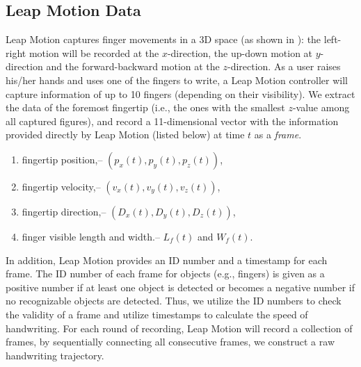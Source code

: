\subsection{Leap Motion Data}
Leap Motion captures finger movements in a 3D space (as shown in ):  the left-right motion will be recorded at the $x$-direction, the up-down motion at $y$-direction and the forward-backward motion at the $z$-direction. 
As a user raises his/her hands and uses one of the fingers to write,  a Leap Motion controller will capture information of up to 10 fingers (depending on their visibility). We extract the data of the foremost fingertip (i.e., the ones with the smallest $z$-value among all captured figures), and record a 11-dimensional vector with the information provided directly by Leap Motion (listed below) at time $t$ as a \textit{frame}.  
\begin{enumerate}
\setlength{\itemsep}{-0.5mm}
\item fingertip position,\quad -- $(p_x(t), p_y(t),p_z(t))$, 
\item fingertip velocity,\quad -- $(v_x(t), v_y(t),v_z(t))$, 
\item fingertip direction,\quad -- $(D_x(t), D_y(t),D_z(t))$, 
\item finger visible length and width.\quad -- $L_f(t)$ and $W_f(t)$. 
\end{enumerate}
In addition, Leap Motion provides an ID number and a timestamp for each frame. The ID number of each frame for objects (e.g., fingers) is given as a positive number if at least one object is detected or becomes a negative number if no recognizable objects are detected. Thus, we utilize the ID numbers to check the validity of a frame and utilize timestamps to calculate the speed of handwriting. 
For each round of recording, Leap Motion will record a collection of  frames, by sequentially connecting all consecutive frames, we construct a raw handwriting trajectory.  



